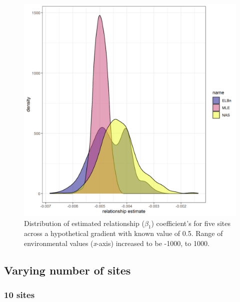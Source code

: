 \documentclass[
]{article}
\begin{document}
\begin{figure}
\centering
\includegraphics{figures/PLB_large_x_relationship_density.png}
\caption{Distribution of estimated relationship (\(\beta_1\))
coefficient's for five sites across a hypothetical gradient with known
value of 0.5. Range of environmental values (\emph{x}-axis) increased to
be -1000, to 1000.}
\end{figure}

\hypertarget{varying-number-of-sites}{%
\subsection{Varying number of sites}\label{varying-number-of-sites}}

\hypertarget{sites}{%
\subsubsection{10 sites}\label{sites}}
\end{document}

